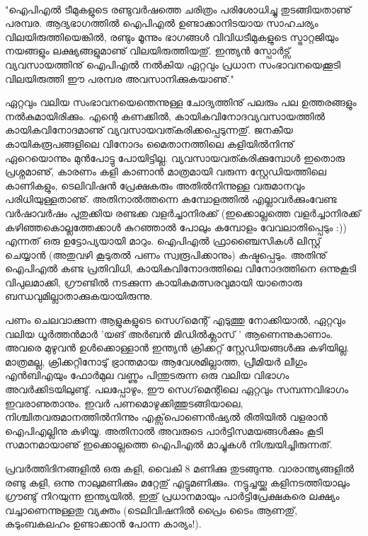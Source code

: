 ﻿
\enlargethispage{2\baselineskip}

‌\begin{framed}
"ഐപിഎല്‍ ടീമുകളുടെ രണ്ടുവര്‍ഷത്തെ ചരിത്രം പരിശോധിച്ചു തുടങ്ങിയതാണു് പരമ്പര. ആദ്യഭാഗത്തില്‍ ഐപിഎല്‍ 
ഉണ്ടാക്കാനിടയായ സാഹചര്യം വിലയിരുത്തിയെങ്കില്‍, രണ്ടും മൂന്നും ഭാഗങ്ങള്‍ വിവിധടീമുകളുടെ സ്ട്രാറ്റജിയും നയങ്ങളും 
ലക്ഷ്യങ്ങളുമാണു് വിലയിരുത്തിയതു്. ഇന്ത്യന്‍ സ്പോര്‍ട്സ് വ്യവസായത്തിനു് ഐപിഎല്‍ നല്‍കിയ ഏറ്റവും 
പ്രധാന സംഭാവനയെക്കൂടി വിലയിരുത്തി ഈ പരമ്പര അവസാനിക്കുകയാണു്."
\end{framed}


ഏറ്റവും വലിയ സംഭാവനയെന്തെന്നുള്ള ചോദ്യത്തിനു് പലരും പല ഉത്തരങ്ങളും നല്‍കുമായിരിക്കും. എന്റെ കണക്കില്‍, 
കായികവിനോദവ്യവസായത്തില്‍ കായികവിനോദമാണു് വ്യവസായവത്കരിക്കപ്പെടുന്നതു്. ജനകീയ കായികരൂപങ്ങളിലെ 
വിനോദം മൈതാനത്തിലെ കളിയില്‍നിന്നു് ഏറെയൊന്നും മുന്‍പോട്ടു പോയിട്ടില്ല. വ്യവസായവത്കരിക്കുമ്പോള്‍ ഇതൊരു 
പ്രശ്നമാണു്, കാരണം കളി കാണാന്‍ മാത്രമായി വരുന്ന സ്റ്റേഡിയത്തിലെ കാണികളും, ടെലിവിഷന്‍ പ്രേക്ഷകരും അതില്‍നിന്നുള്ള വരുമാനവും പരിധിയുള്ളതാണു്. അതിനാല്‍ത്തന്നെ കമ്പോളത്തില്‍ എല്ലാവര്‍ക്കുംവേണ്ട വര്‍ഷാവര്‍ഷം പുതുക്കിയ രണ്ടക്ക വളര്‍ച്ചാനിരക്ക് 
(ഇക്കൊല്ലത്തെ വളര്‍ച്ചാനിരക്ക് കഴിഞ്ഞകൊല്ലത്തേക്കാള്‍ കുറഞ്ഞാല്‍ പോലും കമ്പോളം 
വേവലാതിപ്പെടും :)) എന്നത് ഒരു ഉട്ടോപ്യയായി മാറും. ഐപിഎല്‍ ഫ്രാഞ്ചൈസികള്‍ ലിസ്റ്റ് ചെയ്യാന്‍ (അതുവഴി കൂടുതല്‍ 
പണം സ്വരൂപിക്കാനും) കഷ്ടപ്പെടും. അതിനു് ഐപിഎല്‍ കണ്ട പ്രതിവിധി, കായികവിനോദത്തിലെ വിനോദത്തിനെ ഒന്നുകൂടി വിപുലമാക്കി, ഗ്രൗണ്ടില്‍ നടക്കുന്ന കായികമത്സരവുമായി യാതൊരു ബന്ധവുമില്ലാതാക്കുകയായിരുന്നു.

പണം ചെലവാക്കുന്ന ആളുകളുടെ സെഗ്‌മെന്റ് എടുത്തു നോക്കിയാല്‍, ഏറ്റവും വലിയ ധൂര്‍ത്തന്‍മാര്‍ 'യങ് അര്‍ബന്‍ 
മിഡില്‍ക്ലാസ് ' ആണെന്നുകാണാം. അവരെ മുഴുവന്‍ ഉള്‍ക്കൊള്ളാന്‍ ഇന്ത്യന്‍ ക്രിക്കറ്റ് സ്റ്റേഡിയങ്ങള്‍ക്കു കഴിയില്ല. മാത്രമല്ല, 
ക്രിക്കറ്റിനോടു് ഭ്രാന്തമായ ആവേശമില്ലാത്ത, പ്രീമിയര്‍ ലീഗും എന്‍ബിഎയും ഫോര്‍മുല വണ്ണും പിന്തുടരുന്ന ഒരു വലിയ വിഭാഗം 
അവര്‍ക്കിടയിലുണ്ടു്. പലപ്പോഴും, ഈ സെഗ്‌മെന്റിലെ ഏറ്റവും സമ്പന്നവിഭാഗം ഇവരാണുതാനും. ഇവര്‍ 
പണമൊഴുക്കിത്തുടങ്ങിയാലെ, നിശ്ചിതവരുമാനത്തില്‍നിന്നും എക്സ്‌പൊണെന്‍ഷ്യല്‍ രീതിയില്‍ വളരാന്‍ ഐപിഎല്ലിനു 
കഴിയൂ. അതിനാല്‍ അവരുടെ പാര്‍ട്ടിസമയങ്ങള്‍ക്കും കൂടി സമാനമായാണു് ഇക്കൊല്ലത്തെ ഐപിഎല്‍ മാച്ചുകള്‍ 
നിശ്ചയിച്ചിരുന്നത്.


പ്രവര്‍ത്തിദിനങ്ങളില്‍ ഒരു കളി, വൈകി 8 മണിക്കു തുടങ്ങുന്നു. വാരാന്ത്യങ്ങളില്‍ രണ്ടു കളി, ഒന്നു നാലുമണിക്കും മറ്റേതു് 
എട്ടുമണിക്കും. നട്ടുച്ചയ്ക്കു കളിനടത്തിയാലും ഗ്രൗണ്ടു് നിറയുന്ന ഇന്ത്യയില്‍, ഇതു് പ്രധാനമായും പാര്‍ട്ടിപ്രേക്ഷകരെ ലക്ഷ്യം 
വച്ചാണെന്നുള്ളതു വ്യക്തം (ടെലിവിഷനില്‍ പ്രൈം ടൈം ആണതു്, കുടുംബകലഹം ഉണ്ടാക്കാന്‍ പോന്ന കാര്യം!).

